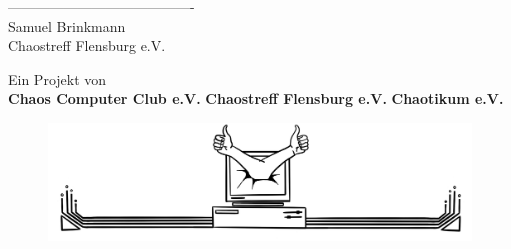 \documentclass{article}
\newcommand{\minifont}[1]{{%
  \fontsize{9pt}{14pt}\normalfont #1%
}}
\newcommand{\smallfont}[1]{{%
  \fontsize{12pt}{16pt}\normalfont #1%
}}
\begin{document}
\begin{adjustwidth}{3cm}{3cm}
    \RaggedLeft ---------------------------------------- \\
    \smallfont{\firasans Samuel Brinkmann} \\
    \minifont{\firasans Chaostreff Flensburg e.V.}
\end{adjustwidth}


\begin{adjustwidth}{3cm}{3cm}
    \bigskip
     \smallfont{\firasans \RaggedRight 
     Ein Projekt von \\ \smallskip
    \textbf{Chaos Computer Club e.V.} \hspace{0.5 cm}
    \textbf{Chaostreff Flensburg e.V.} \hspace{0.5 cm}
    \textbf{Chaotikum e.V.} }
\end{adjustwidth}

\begin{figure}[b]
	\begin{center}
		\includegraphics[width=0.8\paperwidth] {deco_bottom}
	\end{center}
\end{figure}
\end{document}
